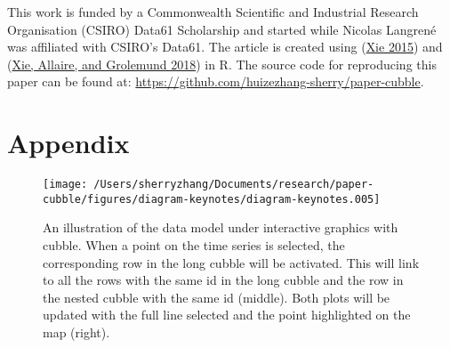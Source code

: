 \documentclass{article}
\begin{document}
This work is funded by a Commonwealth Scientific and Industrial Research Organisation (CSIRO) Data61 Scholarship and started while Nicolas Langrené was affiliated with CSIRO's Data61. The article is created using  (\protect\hyperlink{ref-knitr}{Xie 2015}) and  (\protect\hyperlink{ref-rmarkdown}{Xie, Allaire, and Grolemund 2018}) in R. The source code for reproducing this paper can be found at: \url{https://github.com/huizezhang-sherry/paper-cubble}.

\hypertarget{appendix}{%
\section{Appendix}\label{appendix}}

\begin{figure}

{\centering \texttt{[image: /Users/sherryzhang/Documents/research/paper-cubble/figures/diagram-keynotes/diagram-keynotes.005]} 

}

\caption{An illustration of the data model under interactive graphics with cubble. When a point on the time series is selected, the corresponding row in the long cubble will be activated. This will link to all the rows with the same id in the long cubble and the row in the nested cubble with the same id (middle). Both plots will be updated with the full line selected and the point highlighted on the map (right).}\label{fig:illu-interactive-2}
\end{figure}

\newpage
\end{document}
